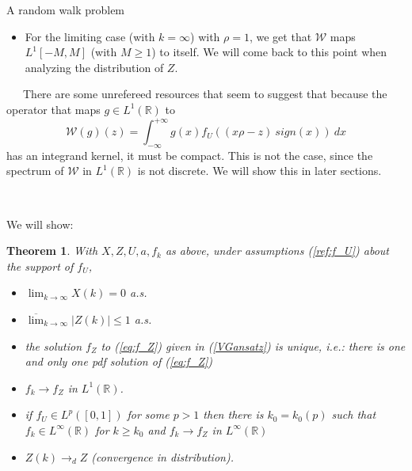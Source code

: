 \documentclass[12pt]{article}
\newtheorem*{thm}{Theorem}
\begin{document}
\begin{section}{A random walk problem}
\begin{itemize}
\item[ii)] For the limiting case (with $k=\infty$) with $\rho = 1$, we get that $\mathcal{W}$ maps $L^1[-M,M]$ (with $M \ge 1$) to itself. We will come back to this point when analyzing the distribution of $Z$.
\end{itemize}


\  
\ 
\ 
There are some unrefereed resources that seem to suggest that because the operator that maps $g \in L^1(\mathbb{R})$ to $$\mathcal{W}(g)(z)=\int_{-\infty}^{+\infty} g(x) f_U\!\left(  \left(x \rho - z \right)\ sign(x) \right) \ dx$$
has an integrand kernel, it must be compact. This is not the case, since the spectrum of $\mathcal{W}$ in $L^1(\mathbb{R})$ is not discrete. We will show this in later sections.    

\  
\ 
\ 


We will show:

\begin{thm} With $X,Z,U,a, f_k$ as above, under assumptions (\ref{ref:f_U}) about the support of $f_U$,
	\begin{itemize}
	\item[a)]  $ \lim_{k \rightarrow \infty} X(k) = 0$ a.s. 
	\item[b)]  $ \overline{ \lim}_{k \rightarrow \infty} |Z(k)| \le 1 $ a.s.
	\item[c)] the solution $f_Z$ to (\ref{eq:f_Z}) given in (\ref{VGansatz}) is unique, i.e.: there is one and only one pdf solution of (\ref{eq:f_Z})
	\item[d)] $ f_k  \rightarrow f_Z$ in $L^1(\mathbb{R})$.
	\item[e)] if $f_U \in L^{p}([0,1])$ for some $p>1$ then there is $k_0 = k_0(p)$ such that $f_k \in L^{\infty}(\mathbb{R})$ for $k \ge k_0$ and 
	$ f_k  \rightarrow f_Z$ in $L^{\infty}(\mathbb{R})$
	\item[f)] $Z(k) \rightarrow_d Z$  (convergence in distribution).
	\end{itemize}
\end{thm}

\end{section}
\end{document}
